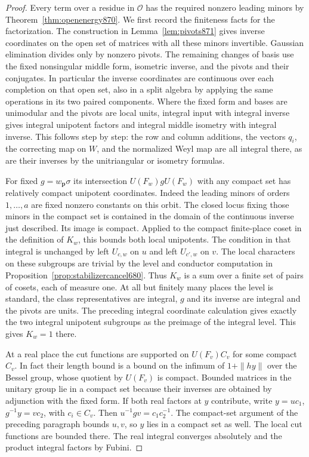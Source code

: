 \documentclass[a4paper,11pt]{article}
\theoremstyle{definition}
\theoremstyle{remark}
\numberwithin{equation}{section}
\begin{document}
\begin{proof}
Every term over a residue in \(\mathcal O\) has the required
nonzero leading minors by Theorem~\ref{thm:openenergy870}.
We first record the finiteness facts for the factorization.
The construction in Lemma~\ref{lem:pivots871} gives inverse
coordinates on the open set of matrices with all these minors
invertible. Gaussian elimination divides only by nonzero pivots.
The remaining changes of basis use the fixed nonsingular middle
form, isometric inverse, and the pivots and their conjugates.
In particular the inverse coordinates are continuous over each
completion on that open set, also in a split algebra by applying
the same operations in its two paired components. Where the
fixed form and bases are unimodular and the pivots are local
units, integral input with integral inverse gives integral
unipotent factors and integral middle isometry with integral
inverse. This follows step by step: the row and column additions,
the vectors \(q_i\), the correcting map on \(W\), and the
normalized Weyl map are all integral there, as are their inverses
by the unitriangular or isometry formulas.

For fixed \(g=w_{\mathbf p}\sigma\) its intersection
\(U(F_w)gU(F_w)\) with any compact set has relatively compact
unipotent coordinates. Indeed the leading minors of orders
\(1,\ldots,a\) are fixed nonzero constants on this orbit. The
closed locus fixing those minors in the compact set is contained
in the domain of the continuous inverse just described. Its
image is compact. Applied to the compact finite-place coset in
the definition of \(K_w\), this bounds both local unipotents.
The condition in that integral is unchanged by left
\(U_{c,w}\) on \(u\) and left \(U_{c',w}\) on \(v\).
The local characters on these subgroups are trivial by the
level and conductor computation in
Proposition~\ref{prop:stabilizercancel680}. Thus \(K_w\) is
a sum over a finite set of pairs of cosets, each of measure
one. At all but finitely many places the level is standard,
the class representatives are integral, \(g\) and its inverse
are integral and the pivots are units. The preceding integral
coordinate calculation gives exactly the two integral unipotent
subgroups as the preimage of the integral level. This gives
\(K_w=1\) there.

At a real place the cut functions are supported on \(U(F_v)C_v\)
for some compact \(C_v\). In fact their length bound is a bound
on the infimum of \(1+\|h y\|\) over the Bessel group, whose
quotient by \(U(F_v)\) is compact. Bounded matrices in the
unitary group lie in a compact set because their inverses are
obtained by adjunction with the fixed form. If both real factors
at \(y\) contribute, write \(y=u c_1\), \(g^{-1}y=v c_2\),
with \(c_i\in C_v\). Then \(u^{-1}g v=c_1c_2^{-1}\).
The compact-set argument of the preceding paragraph bounds
\(u,v\), so \(y\) lies in a compact set as well. The local
cut functions are bounded there. The real integral converges
absolutely and the product integral factors by Fubini.


\end{proof}
\end{document}
